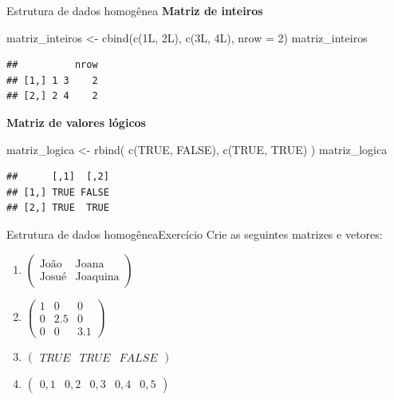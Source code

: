 \documentclass[
  10pt,
  ignorenonframetext,
]{beamer}
\newenvironment{Shaded}{}{}
\newcommand{\DataTypeTok}[1]{#1}
\newcommand{\DecValTok}[1]{#1}
\newcommand{\KeywordTok}[1]{\textcolor[rgb]{0.00,0.00,1.00}{#1}}
\newcommand{\NormalTok}[1]{#1}
\newcommand{\OtherTok}[1]{\textcolor[rgb]{1.00,0.25,0.00}{#1}}
\newcommand{\StringTok}[1]{\textcolor[rgb]{0.00,0.50,0.50}{#1}}
\providecommand{\tightlist}{%
  \setlength{\itemsep}{0pt}\setlength{\parskip}{0pt}}
\begin{document}
\begin{frame}[fragile]{Estrutura de dados homogênea}
\protect\hypertarget{estrutura-de-dados-homoguxeanea-6}{}
\textbf{Matriz de inteiros}

\begin{Shaded}
\begin{Highlighting}[]
\NormalTok{matriz\_inteiros \textless{}{-}}\StringTok{ }\KeywordTok{cbind}\NormalTok{(}\KeywordTok{c}\NormalTok{(1L, 2L), }\KeywordTok{c}\NormalTok{(3L, 4L), }\DataTypeTok{nrow =} \DecValTok{2}\NormalTok{)}
\NormalTok{matriz\_inteiros}
\end{Highlighting}
\end{Shaded}

\begin{verbatim}
##          nrow
## [1,] 1 3    2
## [2,] 2 4    2
\end{verbatim}

\textbf{Matriz de valores lógicos}

\begin{Shaded}
\begin{Highlighting}[]
\NormalTok{matriz\_logica \textless{}{-}}\StringTok{ }\KeywordTok{rbind}\NormalTok{(}
  \KeywordTok{c}\NormalTok{(}\OtherTok{TRUE}\NormalTok{, }\OtherTok{FALSE}\NormalTok{),}
  \KeywordTok{c}\NormalTok{(}\OtherTok{TRUE}\NormalTok{, }\OtherTok{TRUE}\NormalTok{)}
\NormalTok{)}
\NormalTok{matriz\_logica}
\end{Highlighting}
\end{Shaded}

\begin{verbatim}
##      [,1]  [,2]
## [1,] TRUE FALSE
## [2,] TRUE  TRUE
\end{verbatim}
\end{frame}

\begin{frame}{Estrutura de dados homogênea\newline Exercício}
\protect\hypertarget{estrutura-de-dados-homoguxeaneaexercuxedcio}{}
Crie as seguintes matrizes e vetores:

\begin{enumerate}
\tightlist
\item
  \(\begin{pmatrix} \text{João} & \text{Joana}\\ \text{Josué} & \text{Joaquina}\end{pmatrix}\)
\item
  \(\begin{pmatrix} 1 & 0 & 0 \\ 0 & 2.5 & 0 \\ 0 & 0 & 3.1 \end{pmatrix}\)
\item
  \(\begin{pmatrix} TRUE & TRUE & FALSE \end{pmatrix}\)
\item
  \(\begin{pmatrix} 0,1 & 0,2 & 0,3 & 0,4 & 0,5 \end{pmatrix}\)
\end{enumerate}
\end{frame}
\end{document}

